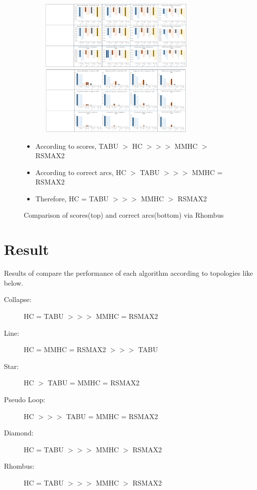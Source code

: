 \documentclass[runningheads,a4paper]{llncs}
\begin{document}
	\begin{figure}
		\centering
		\includegraphics[width=280pt, height=95pt]{images/06_Rhombus_Score}
		\includegraphics[width=280pt, height=95pt]{images/06_Rhombus_Arcs}
		\caption{Comparison of scores(top) and correct arcs(bottom) via Rhombus}
		{
			\begin{itemize}
				\item According to scores, TABU $>$ HC $>>>$ MMHC $>$ RSMAX2
				
				\item According to correct arcs, HC $>$ TABU $>>>$ MMHC = RSMAX2
				
				\item Therefore, {\color{red}HC = TABU $>>>$ MMHC $>$ RSMAX2}
			\end{itemize}
		}
	\end{figure}	



\newpage{}

\section{Result}

	Results of compare the performance of each algorithm according to topologies like below.
	
	\begin{description}
		\item[Collapse:] {\color{red}HC = TABU} $>>>$ MMHC = RSMAX2
		
		\item[Line:] {\color{red}HC = MMHC = RSMAX2} $>>>$ TABU
		
		\item[Star:] {\color{red}HC} $>$ TABU = MMHC = RSMAX2
		
		\item[Pseudo Loop:] {\color{red}HC} $>>>$ TABU = MMHC = RSMAX2
		
		\item[Diamond:] {\color{red}HC = TABU} $>>>$ MMHC $>$ RSMAX2
		
		\item[Rhombus:] {\color{red}HC = TABU} $>>>$ MMHC $>$ RSMAX2
	\end{description}	 
\end{document}
